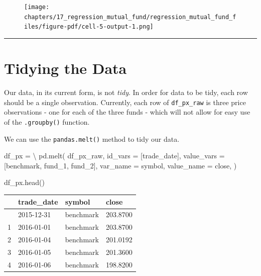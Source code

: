 \documentclass[
  letterpaper,
  DIV=11,
  numbers=noendperiod]{scrreprt}
\newenvironment{Shaded}{\begin{snugshade}}{\end{snugshade}}
\newcommand{\NormalTok}[1]{\textcolor[rgb]{0.00,0.23,0.31}{#1}}
\newcommand{\OperatorTok}[1]{\textcolor[rgb]{0.37,0.37,0.37}{#1}}
\newcommand{\StringTok}[1]{\textcolor[rgb]{0.13,0.47,0.30}{#1}}
\begin{document}
\begin{figure}[H]

{\centering \texttt{[image: chapters/17\_regression\_mutual\_fund/regression\_mutual\_fund\_files/figure-pdf/cell-5-output-1.png]}

}

\end{figure}

\begin{center}\rule{0.5\linewidth}{0.5pt}\end{center}

\hypertarget{tidying-the-data}{%
\section{Tidying the Data}\label{tidying-the-data}}

Our data, in its current form, is not \emph{tidy}. In order for data to
be tidy, each row should be a single observation. Currently, each row of
\texttt{df\_px\_raw} is three price observations - one for each of the
three funds - which will not allow for easy use of the
\texttt{.groupby()} function.

We can use the \texttt{pandas.melt()} method to tidy our data.

\begin{Shaded}
\begin{Highlighting}[]
\NormalTok{df\_px }\OperatorTok{=} \OperatorTok{\textbackslash{}}
\NormalTok{    pd.melt(}
\NormalTok{        df\_px\_raw, }
\NormalTok{        id\_vars }\OperatorTok{=}\NormalTok{ [}\StringTok{\textquotesingle{}trade\_date\textquotesingle{}}\NormalTok{],}
\NormalTok{        value\_vars }\OperatorTok{=}\NormalTok{ [}\StringTok{\textquotesingle{}benchmark\textquotesingle{}}\NormalTok{, }\StringTok{\textquotesingle{}fund\_1\textquotesingle{}}\NormalTok{, }\StringTok{\textquotesingle{}fund\_2\textquotesingle{}}\NormalTok{], }
\NormalTok{        var\_name }\OperatorTok{=} \StringTok{\textquotesingle{}symbol\textquotesingle{}}\NormalTok{, }
\NormalTok{        value\_name }\OperatorTok{=} \StringTok{\textquotesingle{}close\textquotesingle{}}\NormalTok{,}
\NormalTok{    )}

\NormalTok{df\_px.head()}
\end{Highlighting}
\end{Shaded}

\begin{longtable}[]{@{}llll@{}}
\toprule\noalign{}
& trade\_date & symbol & close \\
\midrule\noalign{}
\endhead
\bottomrule\noalign{}
\endlastfoot
0 & 2015-12-31 & benchmark & 203.8700 \\
1 & 2016-01-01 & benchmark & 203.8700 \\
2 & 2016-01-04 & benchmark & 201.0192 \\
3 & 2016-01-05 & benchmark & 201.3600 \\
4 & 2016-01-06 & benchmark & 198.8200 \\
\end{longtable}
\end{document}
